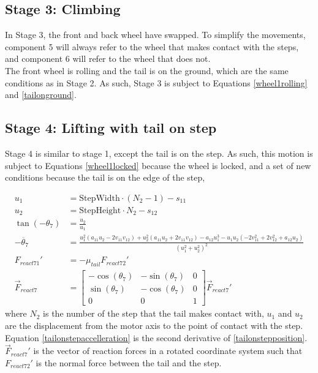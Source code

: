 \subsection*{Stage 3: Climbing}

In Stage 3, the front and back wheel have swapped. To simplify the movements, component 5 will always refer to the wheel that makes contact with the steps, and component 6 will refer to the wheel that does not. \\
The front wheel is rolling and the tail is on the ground, which are the same conditions as in Stage 2. As such, Stage 3 is subject to Equations \ref{wheel1rolling} and \ref{tailonground}.

\subsection*{Stage 4: Lifting with tail on step}
Stage 4 is similar to stage 1, except the tail is on the step. As such, this motion is subject to Equations \ref{wheel1locked} because the wheel is locked, and a set of new conditions because the tail is on the edge of the step,

\begin{subequations}
	\label{tailonstep}
	\begin{align}
		u_1 &= \mathrm{StepWidth}\cdot (N_2-1)- s_{11}\\
		u_2 &= \mathrm{StepHeight}\cdot N_2 - s_{12}\\
		\tan{(-\theta_7)} &= \frac{u_2}{u_1}\\
		\label{tailonstepposition}
		-\ddot{\theta_7} &= \frac{ u_1^2 (a_{11} u_2  - 2 v_{11} v_{12}) 
			+ u_2^2 (a_{11} u_2 + 2  v_{11}  v_{12}  )  
			-  a_{12} u_1^3 
			- u_1  u_2  (- 2  v_{11}^2 + 2 v_{12}^2 + a_{12} u_2  )}
		{(u_1^2 + u_2^2)^2}\\
		\label{tailonstepaccelleration}
		F_{react71}' &= -\mu_{tail} F_{react72}'\\
		\vec{F}_{react7} &= \begin{bmatrix}
			-\cos{(\theta_7)} & -\sin{(\theta_7)} & 0\\
			\sin{(\theta_7)} & -\cos{(\theta_7)} & 0\\
			0 & 0 & 1
		\end{bmatrix} \vec{F}_{react7}'
	\end{align}
\end{subequations}
where $N_2$ is the number of the step that the tail makes contact with, $u_1$ and $u_2$ are the displacement from the motor axis to the point of contact with the step. Equation \ref{tailonstepaccelleration} is the second derivative of \ref{tailonstepposition}. $\vec{F}_{react7}'$ is the vector of reaction forces in a rotated coordinate system such that $F_{react72}'$ is the normal force between the tail and the step.

